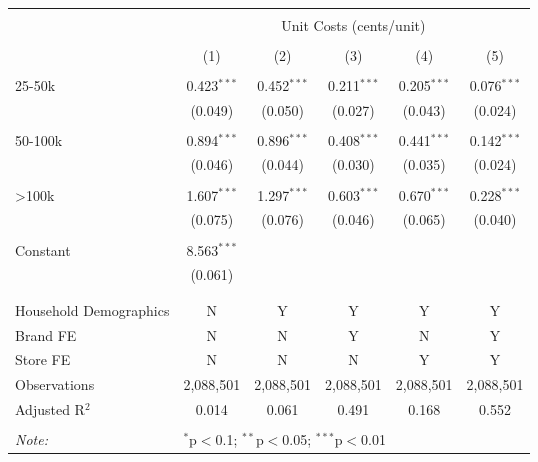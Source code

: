 
\begin{table}[!htbp] \centering 
  \caption{} 
  \label{} 
\begin{tabular}{@{\extracolsep{5pt}}lccccc} 
\\[-1.8ex]\hline 
\hline \\[-1.8ex] 
 & \multicolumn{5}{c}{Unit Costs (cents/unit)} \\ 
\cline{2-6} 
\\[-1.8ex] & (1) & (2) & (3) & (4) & (5)\\ 
\hline \\[-1.8ex] 
 25-50k & 0.423$^{***}$ & 0.452$^{***}$ & 0.211$^{***}$ & 0.205$^{***}$ & 0.076$^{***}$ \\ 
  & (0.049) & (0.050) & (0.027) & (0.043) & (0.024) \\ 
  & & & & & \\ 
 50-100k & 0.894$^{***}$ & 0.896$^{***}$ & 0.408$^{***}$ & 0.441$^{***}$ & 0.142$^{***}$ \\ 
  & (0.046) & (0.044) & (0.030) & (0.035) & (0.024) \\ 
  & & & & & \\ 
 >100k & 1.607$^{***}$ & 1.297$^{***}$ & 0.603$^{***}$ & 0.670$^{***}$ & 0.228$^{***}$ \\ 
  & (0.075) & (0.076) & (0.046) & (0.065) & (0.040) \\ 
  & & & & & \\ 
 Constant & 8.563$^{***}$ &  &  &  &  \\ 
  & (0.061) &  &  &  &  \\ 
  & & & & & \\ 
\hline \\[-1.8ex] 
Household Demographics & N & Y & Y & Y & Y \\ 
Brand FE & N & N & Y & N & Y \\ 
Store FE & N & N & N & Y & Y \\ 
Observations & 2,088,501 & 2,088,501 & 2,088,501 & 2,088,501 & 2,088,501 \\ 
Adjusted R$^{2}$ & 0.014 & 0.061 & 0.491 & 0.168 & 0.552 \\ 
\hline 
\hline \\[-1.8ex] 
\textit{Note:}  & \multicolumn{5}{l}{$^{*}$p$<$0.1; $^{**}$p$<$0.05; $^{***}$p$<$0.01} \\ 
\end{tabular} 
\end{table} 

